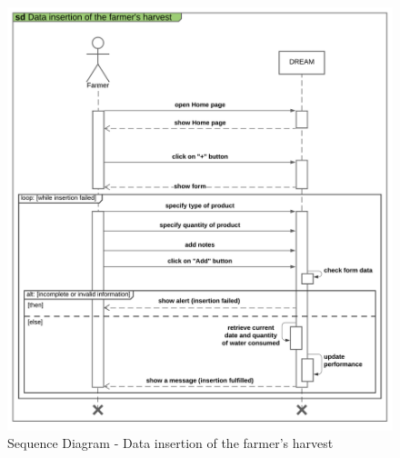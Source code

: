 \begin{center}
    \begin{figure}[H]
  \includegraphics[width=\textwidth,height=\textheight,keepaspectratio]{./Images/Sequence diagram Data insertion of the farmer's harvest.png}
  \caption{Sequence Diagram - Data insertion of the farmer's harvest}
\end{figure}
\end{center}


